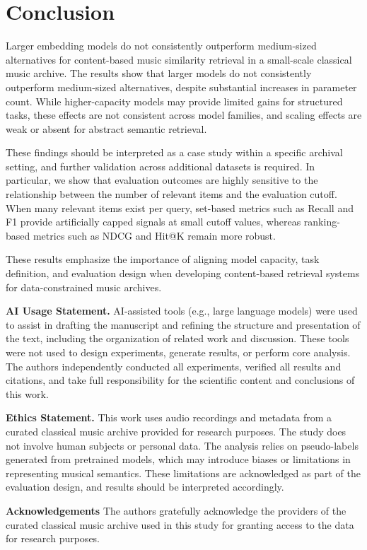 \documentclass{article}
\begin{document}
\section{Conclusion}

Larger embedding models do not consistently outperform medium-sized alternatives for content-based music similarity retrieval in a small-scale classical music archive. The results show that larger models do not consistently outperform medium-sized alternatives, despite substantial increases in parameter count. While higher-capacity models may provide limited gains for structured tasks, these effects are not consistent across model families, and scaling effects are weak or absent for abstract semantic retrieval.

These findings should be interpreted as a case study within a specific archival setting, and further validation across additional datasets is required. In particular, we show that evaluation outcomes are highly sensitive to the relationship between the number of relevant items and the evaluation cutoff. When many relevant items exist per query, set-based metrics such as Recall and F1 provide artificially capped signals at small cutoff values, whereas ranking-based metrics such as NDCG and Hit@K remain more robust.

These results emphasize the importance of aligning model capacity, task definition, and evaluation design when developing content-based retrieval systems for data-constrained music archives.



\noindent\textbf{AI Usage Statement.}
AI-assisted tools (e.g., large language models) were used to assist in drafting the manuscript and refining the structure and presentation of the text, including the organization of related work and discussion. These tools were not used to design experiments, generate results, or perform core analysis. The authors independently conducted all experiments, verified all results and citations, and take full responsibility for the scientific content and conclusions of this work.


\noindent\textbf{Ethics Statement.}
This work uses audio recordings and metadata from a curated classical music archive provided for research purposes. The study does not involve human subjects or personal data. The analysis relies on pseudo-labels generated from pretrained models, which may introduce biases or limitations in representing musical semantics. These limitations are acknowledged as part of the evaluation design, and results should be interpreted accordingly.

\noindent\textbf{Acknowledgements}
The authors gratefully acknowledge the providers of the curated classical music archive used in this study for granting access to the data for research purposes.
\end{document}
